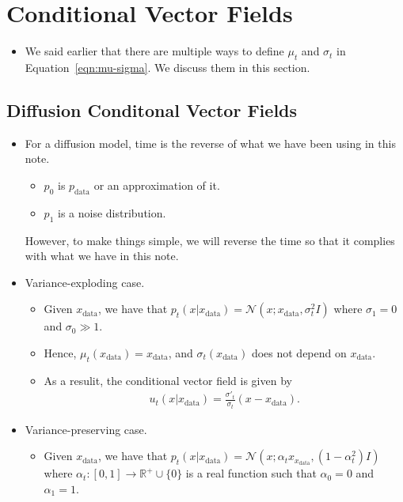 \documentclass[10pt]{article}
\newcommand{\mcal}[1]{\mathcal{#1}}
\newcommand{\Real}{\mathbb{R}}
\newcommand{\data}{\mathrm{data}}
\begin{document}
\section{Conditional Vector Fields}

\begin{itemize}
  \item We said earlier that there are multiple ways to define $\mu_t$ and $\sigma_t$ in Equation~\eqref{eqn:mu-sigma}. We discuss them in this section.
\end{itemize}

\subsection{Diffusion Conditonal Vector Fields}

\begin{itemize}
  \item For a diffusion model, time is the reverse of what we have been using in this note.
  \begin{itemize}
    \item $p_0$ is $p_{\data}$ or an approximation of it.
    \item $p_1$ is a noise distribution.
  \end{itemize}
  However, to make things simple, we will reverse the time so that it complies with what we have in this note.

  \item Variance-exploding case.
  \begin{itemize}
    \item Given $x_{\data}$, we have that $p_t(x|x_{\data}) = \mcal{N}(x; x_{\data}, \sigma_t^2 I )$ where $\sigma_1 = 0$ and $\sigma_0 \gg 1$. 
    \item Hence, $\mu_t(x_{\data}) = x_{\data}$, and $\sigma_t(x_{\data})$ does not depend on $x_{\data}$.
    \item As a resulit, the conditional vector field is given by
    \begin{align*}
      u_t(x|x_\data) = \frac{\sigma'_t}{\sigma_t} (x - x_{\data}).
    \end{align*}
  \end{itemize}

  \item Variance-preserving case.
  \begin{itemize}
    \item Given $x_{\data}$, we have that $p_t(x|x_{\data}) = \mcal{N}(x; \alpha_t x_{x_{\data}}, (1 - \alpha_t^2)I)$ where $\alpha_t: [0,1] \rightarrow \Real^{+} \cup \{ 0 \}$ is a real function such that $\alpha_0 = 0$ and $\alpha_1 = 1$.
    

\end{itemize}
\end{itemize}
\end{document}
